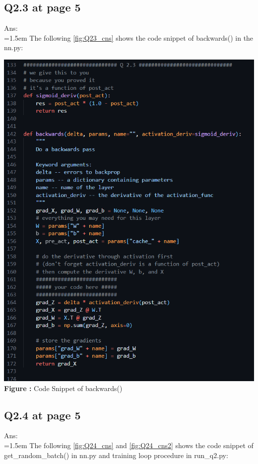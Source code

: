 \documentclass{article}
\begin{document}
	\subsection*{Q2.3 at page 5}
	Ans:\\
	\hangindent=1.5em \hspace{1.5em}  The following \autoref{fig:Q23_cns} shows the code snippet of backwards() in the nn.py:
	\newline

	\begin{minipage}{1\linewidth}
		\centering
		\hspace{0.12\linewidth} 
		\includegraphics[width=0.7\linewidth]{./Q23_cns.png}  %
		\newline
		\textbf{Figure \thefigure:} Code Snippet of backwards() %
		\label{fig:Q23_cns}  %
	\end{minipage}	
	\newpage	
	
	\subsection*{Q2.4 at page 5}
	Ans:\\
	\hangindent=1.5em \hspace{1.5em}  The following \autoref{fig:Q24_cns} and \autoref{fig:Q24_cns2} shows the code snippet of get\_random\_batch() in nn.py and training loop procedure in run\_q2.py:
	\newline	
	
\end{document}
